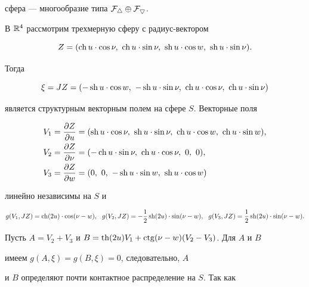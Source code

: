 сфера --- многообразие типа $\cal F_4\oplus\cal F_5$. 


 


В $\Bbb R^4$ рассмотрим трехмерную сферу с радиус-вектором 


$$ 


Z=(\ch u\cdot\cos \nu,\ \ch u\cdot\sin \nu, 


\ \sh u\cdot\cos w,\ \sh u\cdot\sin \nu). 


$$ 


Тогда 


$$ 


\xi=J Z=(-\sh u\cdot\cos w,\ -\sh u\cdot\sin \nu, 


\ \ch u\cdot\cos \nu,\ \ch u\cdot\sin \nu) 


$$ 


является структурным векторным полем на сфере $S$. Векторные поля 


\begin{align*} 


V_1&=\frac{\partial Z}{\partial u}=(\sh u\cdot\cos \nu, 


\ \sh u\cdot\sin \nu,\ \ch u\cdot\cos w,\ \ch u\cdot\sin w),\\ 


V_2&=\frac{\partial Z}{\partial \nu}=(-\ch u\cdot\sin \nu, 


\ \ch u\cdot\cos \nu,\ 0, \ 0), \\ 


V_3&=\frac{\partial Z}{\partial w}=(0,\ 0,\ -\sh u\cdot\sin w, 


\ \sh u\cdot \cos w) 


\end{align*} 


линейно независимы на $S$ и 


$$ 


g(V_1,J Z)=\ch(2u)\cdot\cos(\nu-w),\ \ 


g(V_2,J Z)=-\frac{1}{2}\sh(2u)\cdot\sin(\nu-w),\ \ 


g(V_3,J Z)=\frac{1}{2}\sh(2u)\cdot\sin(\nu-w). 


$$ 


 


Пусть $A=V_2+V_3$ и $B=\operatorname{th}(2u)V_1+\operatorname{ctg}(\nu-w)(V_2-V_3)$. Для $A$ и $B$ 


имеем $g(A,\xi)=g(B,\xi)=0$, следовательно, $A$ 


и $B$ определяют почти контактное распределение на $S$. Так как 


